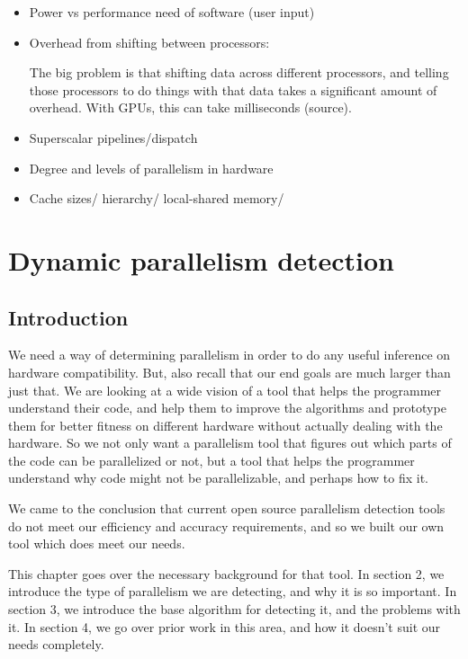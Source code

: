 \documentclass[12pt,twoside]{reedthesis}
\begin{document}
	\begin{itemize}
		\item Power vs performance need of software (user input)

		\item Overhead from shifting between processors:

		The big problem is that shifting data across different processors, and telling those processors to do things with that data takes a significant amount of overhead. With GPUs, this can take milliseconds (source).

		\item Superscalar pipelines/dispatch

		\item Degree and levels of parallelism in hardware

		\item Cache sizes/ hierarchy/ local-shared memory/

	\end{itemize}

\chapter{Dynamic parallelism detection}

	\section{Introduction}
	
		We need a way of determining parallelism in order to do any useful inference on hardware compatibility. But, also recall that our end goals are much larger than just that. We are looking at a wide vision of a tool that helps the programmer understand their code, and help them to improve the algorithms and prototype them for better fitness on different hardware without actually dealing with the hardware. So we not only want a parallelism tool that figures out which parts of the code can be parallelized or not, but a tool that helps the programmer understand why code might not be parallelizable, and perhaps how to fix it. 
		 
		We came to the conclusion that current open source parallelism detection tools do not meet our efficiency and accuracy requirements, and so we built our own tool which does meet our needs. 
		
		This chapter goes over the necessary background for that tool. In section 2, we introduce the type of parallelism we are detecting, and why it is so important. In section 3, we introduce the base algorithm for detecting it, and the problems with it. In section 4, we go over prior work in this area, and how it doesn't suit our needs completely. 
		
\end{document}
